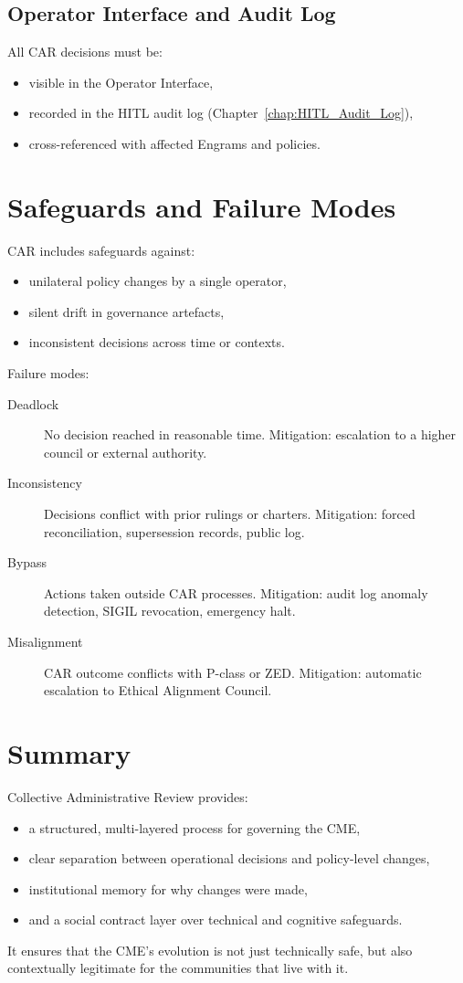 \subsection{Operator Interface and Audit Log}

All CAR decisions must be:
\begin{itemize}
    \item visible in the Operator Interface,
    \item recorded in the HITL audit log (Chapter~\ref{chap:HITL_Audit_Log}),
    \item cross-referenced with affected Engrams and policies.
\end{itemize}

\section{Safeguards and Failure Modes}

CAR includes safeguards against:
\begin{itemize}
    \item unilateral policy changes by a single operator,
    \item silent drift in governance artefacts,
    \item inconsistent decisions across time or contexts.
\end{itemize}

Failure modes:
\begin{description}
    \item[Deadlock] No decision reached in reasonable time.  
          Mitigation: escalation to a higher council or external authority.
    \item[Inconsistency] Decisions conflict with prior rulings or charters.  
          Mitigation: forced reconciliation, supersession records, public log.
    \item[Bypass] Actions taken outside CAR processes.  
          Mitigation: audit log anomaly detection, SIGIL revocation, emergency halt.
    \item[Misalignment] CAR outcome conflicts with P-class or ZED.  
          Mitigation: automatic escalation to Ethical Alignment Council.
\end{description}

\section{Summary}

Collective Administrative Review provides:
\begin{itemize}
    \item a structured, multi-layered process for governing the CME,
    \item clear separation between operational decisions and policy-level changes,
    \item institutional memory for why changes were made,
    \item and a social contract layer over technical and cognitive safeguards.
\end{itemize}

It ensures that the CME’s evolution is not just technically safe, but also
contextually legitimate for the communities that live with it.
